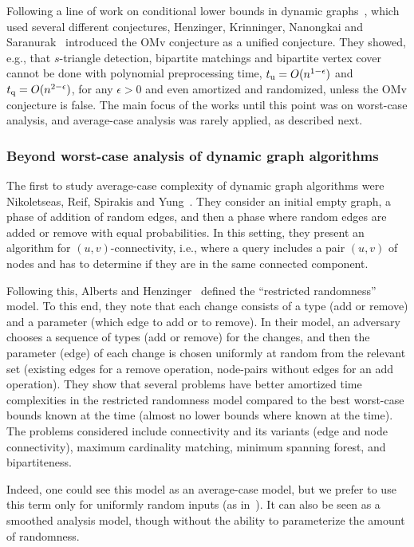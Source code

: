 \documentclass[letter,11pt]{article}
\newcommand{\omv}{\textnormal{\textsf{OMv}}\xspace}
\newcommand{\tu}{t_{\textnormal{u}}}
\newcommand{\tq}{t_{\textnormal{q}}}
\begin{document}
Following a line of work on conditional lower bounds in dynamic graphs~\cite{AbboudW14,Patrascu10,DorHZ00,RodittyZ11,KopelowitzPP16}, which used several different conjectures,
Henzinger, Krinninger, Nanongkai and Saranurak~\cite{HenzingerKNS15} introduced the \omv conjecture as a unified conjecture.
They showed, e.g., that 
$s$-triangle detection,
bipartite matchings
and
bipartite vertex cover cannot be done with
polynomial preprocessing time, 
	$\tu=O(n^{1-\epsilon})$
and
$\tq=O(n^{2-\epsilon})$,
for any $\epsilon>0$ and even amortized and randomized,
unless the \omv conjecture is false.	
The main focus of the works until this point was on worst-case analysis,
and average-case analysis was rarely applied, as described next.


\subsubsection{Beyond worst-case analysis of dynamic graph algorithms}

The first to study average-case complexity of dynamic graph algorithms were 
Nikoletseas, Reif, Spirakis and Yung~\cite{NikoletseasRSY95}.
They consider an initial empty graph, a phase of addition of random edges, and then a phase where random edges are added or remove with equal probabilities. 
In this setting, they present an algorithm for $(u,v)$-connectivity, i.e., where a query includes a pair $(u,v)$ of nodes and has to determine if they are in the same connected component.

Following this, Alberts and Henzinger~\cite{AlbertsH98} 
defined the ``restricted randomness'' model.
To this end, they note that each change consists of a type (add or remove) and a parameter (which edge to add or to remove).
In their model, an adversary chooses a sequence of types (add or remove) for the changes,
and then the parameter (edge) of each change is chosen uniformly at random from the relevant set (existing edges for a remove operation, node-pairs without edges for an add operation).
They show that several problems have better amortized time complexities in the restricted randomness model compared to the best worst-case bounds known at the time (almost no lower bounds where known at the time).
The problems considered include connectivity and its variants (edge and node connectivity), 
maximum cardinality matching, 
minimum spanning forest, and bipartiteness. 

Indeed, one could see this model as an average-case model, but we prefer to use this term only for uniformly random inputs (as in~\cite{NikoletseasRSY95,HLS22}). 
It can also be seen as a smoothed analysis model, though without the ability to parameterize the amount of randomness.
\end{document}
